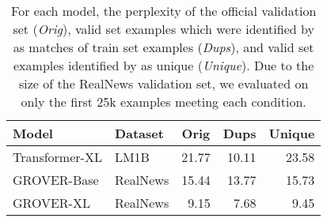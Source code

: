 

\begin{table}[]
    \centering
    \small
    \begin{tabular}{ll|rrr}
    \toprule
    Model & Dataset & \multicolumn{1}{c}{Orig} & \multicolumn{1}{c}{Dups} & \multicolumn{1}{c}{Unique} \\
    \midrule
    Transformer-XL & LM1B & 21.77 & 10.11  & 23.58  \\
    GROVER-Base  & RealNews & 15.44 & 13.77 & 15.73  \\
    GROVER-XL & RealNews & 9.15 & 7.68 & 9.45 \\
    \bottomrule
    \end{tabular}
    \caption{For each model, the perplexity of the official validation set (\textit{Orig}), valid set examples which were identified by \Approx{} as matches of train set examples (\textit{Dups}), and valid set examples identified by \Approx{} as unique (\textit{Unique}).
    Due to the size of the RealNews validation set, we evaluated on only the first 25k examples meeting each condition.}
    \label{tab:ppl_sota_models}
\end{table}